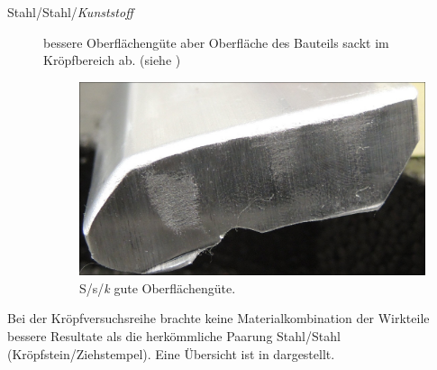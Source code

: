 \documentclass[12pt,a4paper,parskip,twoside,BCOR5mm,headsepline]{scrartcl}
\begin{document}
\begin{description*}
\begin{description}
\item[Stahl/Stahl/\emph{Kunststoff}] bessere Oberflächengüte aber Oberfläche des Bauteils sackt im Kröpfbereich ab. (siehe )
\begin{figure}[H]
\centering
\includegraphics[width=.8\textwidth]{Ssk1}
\caption{S/s/\emph{k} gute Oberflächengüte. }
\label{fig:Ssk1}
\end{figure}
\end{description}
Bei der Kröpfversuchsreihe brachte keine Materialkombination der Wirkteile bessere Resultate als die herkömmliche Paarung Stahl/Stahl (Kröpfstein/Ziehstempel). Eine Übersicht ist in  dargestellt.


\end{description*}
\end{document}
